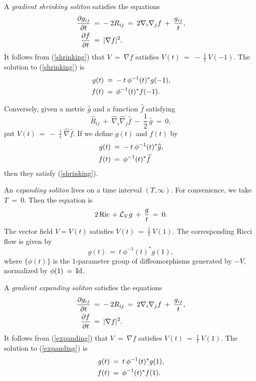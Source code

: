 A {\em gradient shrinking soliton} satisfies the equations
\begin{align} \label{shrinking}
\frac{\partial g_{ij}}{\partial t} \: & = \: - \: 2 R_{ij} \: = \:
2 \nabla_i \nabla_j f \: + \: \frac{g_{ij}}{t}, \\
\frac{\partial f}{\partial t} \: & = \: |\nabla f|^2. \notag
\end{align}
It follows from (\ref{shrinking}) that
$V \: = \: \nabla f$ satisfies $V(t) \: = \: - \: \frac{1}{t} \: V(-1)$.
The solution to (\ref{shrinking}) is
\begin{align} \label{shrinkingsoln}
g(t) \: & = \: - \: t \: \phi^{-1}(t)^* g(-1), \\
f(t) \: & = \: \phi^{-1}(t)^* f(-1). \notag
\end{align}

Conversely, given a metric $\widehat{g}$ and a function $\widehat{f}$
satisfying
\begin{equation}
\widehat{R}_{ij} \: + \: \widehat{\nabla}_i \widehat{\nabla}_j \widehat{f}
\: - \: \frac{1}{2} \:
\widehat{g}
\: = \: 0,
\end{equation}
put $V(t) \: = \: - \: \frac{1}{t} \: \widehat{\nabla} \widehat{f}$.
If we define $g(t)$ and $f(t)$ by
\begin{align}
g(t) \: & = \: - \: t \: \phi^{-1}(t)^* \widehat{g}, \\
f(t) \: & = \: \phi^{-1}(t)^* \widehat{f} \notag
\end{align}
then they satisfy (\ref{shrinking}).

An {\em expanding soliton} lives on a time interval $(T, \infty)$.
For convenience, we take $T \: = \: 0$. Then the equation is
\begin{equation}
2\operatorname{Ric} \: + \: {\mathcal L}_V g \: + \: \frac{g}{t} \: = \: 0.
\end{equation}
The vector field $V = V(t)$ satisfies
$V(t) \: = \: \frac{1}{t} \: V(1)$.
The corresponding Ricci flow is given by
\begin{equation}
g(t) \: = \: t \: \phi^{-1}(t)^* g(1),
\end{equation}
where $\{ \phi(t) \}$ is the $1$-parameter group of diffeomorphisms generated
by $- V$, normalized by $\phi(1) \: = \: \operatorname{Id}$.

A {\em gradient expanding soliton} satisfies the equations
\begin{align} \label{expanding}
\frac{\partial g_{ij}}{\partial t} \: & = \: - \: 2 R_{ij} \: = \:
2 \nabla_i \nabla_j f \: + \: \frac{g_{ij}}{t}, \\
\frac{\partial f}{\partial t} \: & = \: |\nabla f|^2. \notag
\end{align}
It follows from (\ref{expanding}) that
$V \: = \: \nabla f$ satisfies $V(t) \: = \: \frac{1}{t} \: V(1)$.
The solution to (\ref{expanding}) is
\begin{align} \label{expandingsoln}
g(t) \: & = \: t \: \phi^{-1}(t)^* g(1), \\
f(t) \: & = \: \phi^{-1}(t)^* f(1). \notag
\end{align}

